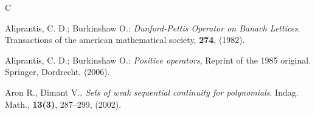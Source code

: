\documentclass[12 pt]{article}%
\newtheorem{final remark}[theorem]{Final Remark}
\begin{document}
\begin{thebibliography}{C}
	
	 Aliprantis, C. D.; Burkinshaw O.: {\it Dunford-Pettis Operator on Banach Lettices}. Transactions of the american mathematical society, {\bf 274}, (1982).
	
	 Aliprantis, C. D.; Burkinshaw O.: {\it Positive operators}, Reprint of the 1985 original. Springer, Dordrecht, (2006).
	
	
	 Aron R., Dimant V., {\it Sets of weak sequential continuity for polynomials}. Indag. Math., {\bf 13(3)}, 287–299, (2002).
	
	
	
	
	
	
	
	
	
	

\end{thebibliography}
\end{document}
